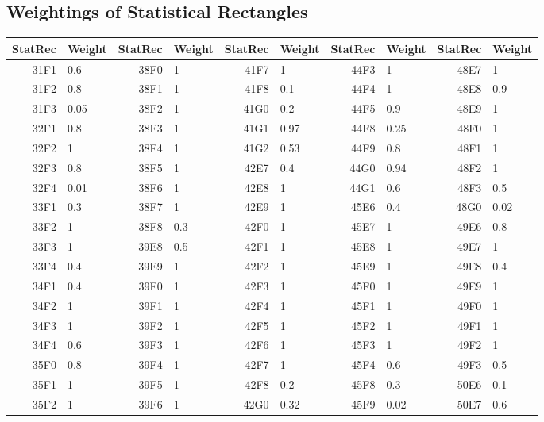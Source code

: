 \documentclass[a4paper 12pt]{article}
\numberwithin{equation}{section}
\begin{document}
\begin{appendices}
 \section{\large Weightings of Statistical Rectangles}
 \label{secAp:weightings}
\begin{table}[ht]
\centering
\begin{footnotesize}
\begin{tabular}{rlrlrlrlrl}
  \hline
 StatRec & Weight & StatRec & Weight & StatRec & Weight & StatRec & Weight & StatRec & Weight \\ 
  \hline
 31F1 &  0.6 & 38F0 &    1 & 41F7 &    1 & 44F3 &    1 & 48E7 &    1 \\ 
 31F2 &  0.8 & 38F1 &    1 & 41F8 &  0.1 & 44F4 &    1 & 48E8 &  0.9 \\ 
 31F3 & 0.05 & 38F2 &    1 & 41G0 &  0.2 & 44F5 &  0.9 & 48E9 &    1 \\ 
 32F1 &  0.8 & 38F3 &    1 & 41G1 & 0.97 & 44F8 & 0.25 & 48F0 &    1 \\ 
 32F2 &    1 & 38F4 &    1 & 41G2 & 0.53 & 44F9 &  0.8 & 48F1 &    1 \\ 
 32F3 &  0.8 & 38F5 &    1 & 42E7 &  0.4 & 44G0 & 0.94 & 48F2 &    1 \\ 
 32F4 & 0.01 & 38F6 &    1 & 42E8 &    1 & 44G1 &  0.6 & 48F3 &  0.5 \\ 
 33F1 &  0.3 & 38F7 &    1 & 42E9 &    1 & 45E6 &  0.4 & 48G0 & 0.02 \\ 
 33F2 &    1 & 38F8 &  0.3 & 42F0 &    1 & 45E7 &    1 & 49E6 &  0.8 \\ 
 33F3 &    1 & 39E8 &  0.5 & 42F1 &    1 & 45E8 &    1 & 49E7 &    1 \\ 
 33F4 &  0.4 & 39E9 &    1 & 42F2 &    1 & 45E9 &    1 & 49E8 &  0.4 \\ 
 34F1 &  0.4 & 39F0 &    1 & 42F3 &    1 & 45F0 &    1 & 49E9 &    1 \\ 
 34F2 &    1 & 39F1 &    1 & 42F4 &    1 & 45F1 &    1 & 49F0 &    1 \\ 
 34F3 &    1 & 39F2 &    1 & 42F5 &    1 & 45F2 &    1 & 49F1 &    1 \\ 
 34F4 &  0.6 & 39F3 &    1 & 42F6 &    1 & 45F3 &    1 & 49F2 &    1 \\ 
 35F0 &  0.8 & 39F4 &    1 & 42F7 &    1 & 45F4 &  0.6 & 49F3 &  0.5 \\ 
 35F1 &    1 & 39F5 &    1 & 42F8 &  0.2 & 45F8 &  0.3 & 50E6 &  0.1 \\ 
 35F2 &    1 & 39F6 &    1 & 42G0 & 0.32 & 45F9 & 0.02 & 50E7 &  0.6 \\ 

\end{tabular}
\end{footnotesize}
\end{table}
\end{appendices}
\end{document}
